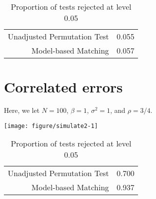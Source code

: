 \documentclass[11pt]{article}\usepackage[]{graphicx}\usepackage[]{color}
\makeatletter
\def\maxwidth{ %
  \ifdim\Gin@nat@width>\linewidth
    \linewidth
  \else
    \Gin@nat@width
  \fi
}
\newenvironment{knitrout}{}{} %
\makeatother
\begin{document}
\begin{table}[ht]
\centering
\begin{tabular}{rr}
  \hline
  \hline
Unadjusted Permutation Test & 0.055 \\ 
  Model-based Matching & 0.057 \\ 
   \hline
\end{tabular}
\caption{Proportion of tests rejected at level 0.05} 
\end{table}


\section{Correlated errors}
Here, we let $N = 100$, $\beta = 1$, $\sigma^2 = 1$, and $\rho = 3/4$.

\begin{knitrout}
\color{fgcolor}

{\centering \texttt{[image: figure/simulate2-1]} 

}



\end{knitrout}

\begin{table}[ht]
\centering
\begin{tabular}{rr}
  \hline
  \hline
Unadjusted Permutation Test & 0.700 \\ 
  Model-based Matching & 0.937 \\ 
   \hline
\end{tabular}
\caption{Proportion of tests rejected at level 0.05} 
\end{table}
\end{document}

